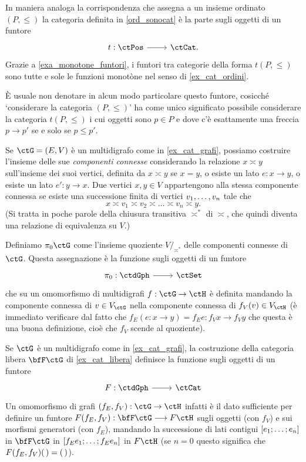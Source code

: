 \begin{remark}\label{ord_come_cat}
	In maniera analoga la corrispondenza che assegna a un insieme ordinato \((P,\le)\) la categoria definita in \ref{ord_sonocat} è la parte sugli oggetti di un funtore
	\[\dmFun{t}{\ctPos}{\ctCat.}\]
	Grazie a \ref{exa_monotone_funtori}, i funtori tra categorie della forma \(t(P,\le)\) sono tutte e sole le funzioni monotòne nel senso di \ref{ex_cat_ordini}.

	\`E usuale non denotare in alcun modo particolare questo funtore, cosicché `considerare la categoria \((P,\le)\)' ha come unico significato possibile considerare la categoria \(t(P,\le)\) i cui oggetti sono \(p\in P\) e dove c'è esattamente una freccia \(p\to p'\) se e solo se \(p\le p'\).
\end{remark}
\begin{example}\label{ex_fun_cpt_conn}
	Se \(\ctG=(E,V)\) è un multidigrafo come in \ref{ex_cat_grafi}, possiamo costruire l'insieme delle sue \emph{componenti connesse} considerando la relazione \(x\asymp y\) sull'insieme dei suoi vertici, definita da \(x\asymp y\) se \(x=y\), o esiste un lato \(e : x \to y\), o esiste un lato \(e' : y\to x\). Due vertici \(x,y\in V\) appartengono alla stessa componente connessa se esiste una successione finita di vertici \(\tup vn,\) tale che
	\[x \asymp v_1 \asymp v_2 \asymp\dots\asymp v_n\asymp y.\]
	(Si tratta in poche parole della chiusura transitiva \(\asymp^*\) di \(\asymp\), che quindi diventa una relazione di equivalenza su \(V\).)

	Definiamo \(\pi_0\ctG\) come l'insieme quoziente \(V/_{\asymp^*}\) delle componenti connesse di \(\ctG\). Questa assegnazione è la funzione sugli oggetti di un funtore
	\[\dmFun{\pi_0}{\ctdGph}{\ctSet}\]
	che su un omomorfismo di multidigrafi \(f : \ctG \to\ctH\) è definita mandando la componente connessa di \(v\in V_\ctG\) nella componente connessa di \(f_V(v)\in V_\ctH\) (è immediato verificare dal fatto che \(f_E(e : x\to y)=f_Ee : f_Vx\to f_Vy\) che questa è una buona definizione, cioè che \(f_V\) scende al quoziente).
\end{example}
\begin{example}
	Se \(\ctG\) è un multidigrafo come in \ref{ex_cat_grafi}, la costruzione della categoria libera \(\bfF\ctG\) di \ref{ex_cat_libera} definisce la funzione sugli oggetti di un funtore
	\[\dmFun F\ctdGph\ctCat\]
	Un omomorfismo di grafi \((f_E,f_V) : \ctG \to \ctH\) infatti è il dato sufficiente per definire un funtore \(F(f_E,f_V) : \bfF\ctG \fun F\ctH\) sugli oggetti (con \(f_V\)) e sui morfismi generatori (con \(f_E\)), mandando la successione di lati contigui \([\tup en;]\) in \(\bfF\ctG\) in \([\tup {{f_E}e}n;]\) in \(F\ctH\) (se \(n=0\) questo significa che \(F(f_E,f_V)(\,) = (\,)\)).
\end{example}
